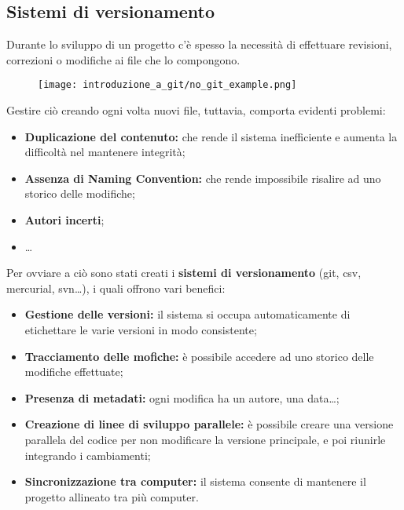 \documentclass[12pt]{article}
\begin{document}
\subsection{Sistemi di versionamento}
Durante lo sviluppo di un progetto c'è spesso la necessità di effettuare revisioni, correzioni o modifiche ai file che lo compongono.
\begin{figure}[H]
\centering
\texttt{[image: introduzione\_a\_git/no\_git\_example.png]}
\end{figure}
Gestire ciò creando ogni volta nuovi file, tuttavia, comporta evidenti problemi:
\begin{itemize}
\item \textbf{Duplicazione del contenuto:} che rende il sistema inefficiente e aumenta la difficoltà nel mantenere integrità;
\item \textbf{Assenza di Naming Convention:} che rende impossibile risalire ad uno storico delle modifiche;
\item \textbf{Autori incerti};
\item \dots
\end{itemize}
\begin{samepage}
Per ovviare a ciò sono stati creati i \textbf{sistemi di versionamento} (git, csv, mercurial, svn\dots), i quali offrono vari benefici:
\begin{itemize}
\item \textbf{Gestione delle versioni:} il sistema si occupa automaticamente di etichettare le varie versioni in modo consistente;
\item \textbf{Tracciamento delle mofiche:} è possibile accedere ad uno storico delle modifiche effettuate;
\item \textbf{Presenza di metadati:} ogni modifica ha un autore, una data\dots;
\item \textbf{Creazione di linee di sviluppo parallele:} è possibile creare una versione parallela del codice per non modificare la versione principale, e poi riunirle integrando i cambiamenti;
\item \textbf{Sincronizzazione tra computer:} il sistema consente di mantenere il progetto allineato tra più computer.
\end{itemize}
\end{samepage}
\end{document}
